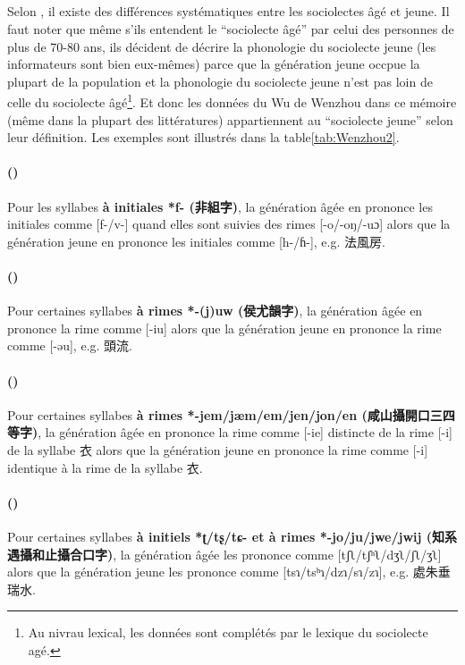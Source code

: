 \documentclass{scrbook}
\newcounter{c}[subsubsection]
\newcommand{\stpc}[1]{\stepcounter{#1}}
\newcommand{\diflaoxin}{sociolectes âgé et jeune\xspace}
\newcommand{\illustre}{Les exemples sont illustrés dans la table\xspace}
\newcommand{\termyyx}[1]{\textbf{#1}}
\begin{document}
\begin{sloppypar}
\subsection{\MakeCapital{\diflaoxin}}
Selon \textcite[6--7]{You1998Wenzhou}, il existe des différences systématiques entre les \diflaoxin. Il faut noter que même s'ils entendent le ``sociolecte âgé'' par celui des personnes de plus de 70-80 ans, ils décident de décrire la phonologie du sociolecte jeune (les informateurs sont bien eux-mêmes) parce que la génération jeune occpue la plupart de la population et la phonologie du sociolecte jeune n'est pas loin de celle du sociolecte âgé\footnote{Au nivrau lexical, les données sont complétés par le lexique du sociolecte agé.}. Et donc les données du Wu de Wenzhou dans ce mémoire (même dans la plupart des littératures) appartiennent au ``sociolecte jeune'' selon leur définition. \illustre \ref{tab:Wenzhou2}. 

\stpc{c}\paragraph{()}
Pour les syllabes \termyyx{à initiales *f- (非組字)}, la génération âgée en prononce les initiales comme [f-/v-] quand elles sont suivies des rimes [-o/-oŋ/-uɔ] alors que la génération jeune en prononce les initiales comme [h-/ɦ-], e.g. 法風房.

\stpc{c}\paragraph{()}
Pour certaines syllabes \termyyx{à rimes *-(j)uw (侯尤韻字)}, la génération âgée en prononce la rime comme [-iu] alors que la génération jeune en prononce la rime comme [-əu], e.g. 頭流. 

\stpc{c}\paragraph{()}
Pour certaines syllabes \termyyx{à rimes *-jem/jæm/em/jen/jon/en (咸山攝開口三四等字)}, la génération âgée en prononce la rime comme [-ie] distincte de la rime [-i] de la syllabe 衣 alors que la génération jeune en prononce la rime comme [-i] identique à la rime de la syllabe 衣. 

\stpc{c}\paragraph{()}
Pour certaines syllabes \termyyx{à initiels *ʈ/tʂ/tɕ- et à rimes *-jo/ju/jwe/jwij (知系遇攝和止攝合口字)}, la génération âgée les prononce comme [tʃʅ/tʃʰʅ/dʒʅ/ʃʅ/ʒʅ] alors que la génération jeune les prononce comme [tsɿ/tsʰɿ/dzɿ/sɿ/zɿ], e.g. 處朱垂瑞水. 


\end{sloppypar}
\end{document}
